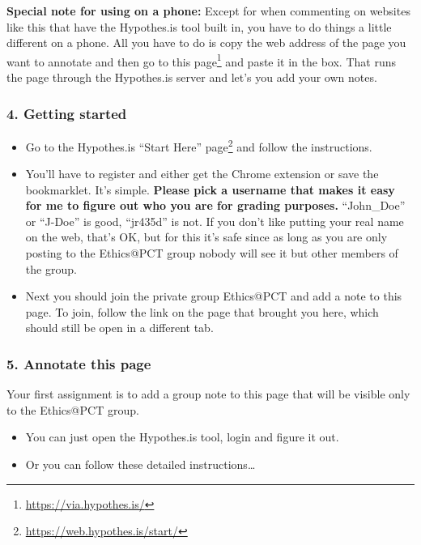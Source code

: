 \documentclass[
  12pt, openany]{book}
\makeatletter
\renewcommand{\href}[2]{#2\footnote{\url{#1}}}
\newenvironment{kframe}{%
\medskip{}
\setlength{\fboxsep}{.8em}
 \def\at@end@of@kframe{}%
 \ifinner\ifhmode%
  \def\at@end@of@kframe{\end{minipage}}%
  \begin{minipage}{\columnwidth}%
 \fi\fi%
 \def\FrameCommand##1{\hskip\@totalleftmargin \hskip-\fboxsep
 \colorbox{shadecolor}{##1}\hskip-\fboxsep
     \hskip-\linewidth \hskip-\@totalleftmargin \hskip\columnwidth}%
 \MakeFramed {\advance\hsize-\width
   \@totalleftmargin\z@ \linewidth\hsize
   \@setminipage}}%
 {\par\unskip\endMakeFramed%
 \at@end@of@kframe}
\newenvironment{rmdblock}[1]
  {
  \begin{itemize}
  \renewcommand{\labelitemi}{
    \raisebox{-.7\height}[0pt][0pt]{
      {\setkeys{Gin}{width=3em,keepaspectratio}\texttt{[image: img/\#1]}}
    }
  }
  \setlength{\fboxsep}{1em}
  \begin{kframe}
  \item
  }
  {
  \end{kframe}
  \end{itemize}
  }
\newenvironment{note}
  {\begin{rmdblock}{note}}
  {\end{rmdblock}}
\makeatother
\begin{document}
\begin{note}

\textbf{Special note for using on a phone:} Except for when commenting on websites like this that have the Hypothes.is tool built in, you have to do things a little different on a phone. All you have to do is copy the web address of the page you want to annotate and then \href{https://via.hypothes.is/}{go to this page} and paste it in the box. That runs the page through the Hypothes.is server and let's you add your own notes.

\end{note}

\hypertarget{getting-started}{%
\subsubsection*{4. Getting started}\label{getting-started}}


\begin{itemize}
\item
  Go to the Hypothes.is \href{https://web.hypothes.is/start/}{``Start Here'' page} and follow the instructions.
\item
  You'll have to register and either get the Chrome extension or save the bookmarklet. It's simple. \textbf{Please pick a username that makes it easy for me to figure out who you are for grading purposes.} ``John\_Doe'' or ``J-Doe'' is good, ``jr435d'' is not. If you don't like putting your real name on the web, that's OK, but for this it's safe since as long as you are only posting to the Ethics@PCT group nobody will see it but other members of the group.
\item
  Next you should join the private group Ethics@PCT and add a note to this page. To join, follow the link on the page that brought you here, which should still be open in a different tab.
\end{itemize}

\hypertarget{annotate-this-page}{%
\subsubsection*{5. Annotate this page}\label{annotate-this-page}}


Your first assignment is to add a group note to this page that will be visible only to the Ethics@PCT group.

\begin{itemize}
\item
  You can just open the Hypothes.is tool, login and figure it out.
\item
  Or you can follow these detailed instructions\ldots{}
\end{itemize}
\end{document}

